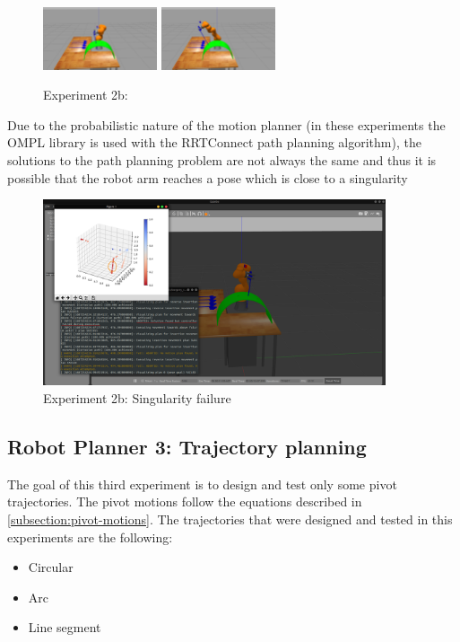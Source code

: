 \begin{center}
\begin{figure}[H]
\includegraphics[width=0.3\textwidth]{images/robot_planner2b/robot_planner2b_8}
\includegraphics[width=0.3\textwidth]{images/robot_planner2b/robot_planner2b_9}\\
\caption{Experiment 2b:}
\end{figure}
\end{center}

Due to the probabilistic nature of the motion planner (in these experiments the OMPL library is used with the RRTConnect path planning algorithm), the solutions 
to the path planning problem are not always the same and thus it is possible that the robot arm reaches a pose which is close to a singularity
\begin{center}
\begin{figure}[H]
\centering
\includegraphics[width=0.9\textwidth]{images/robot_planner2b/singularity_failure.png}
\caption{Experiment 2b: Singularity failure}
\end{figure}
\end{center}

\subsection{Robot Planner 3: Trajectory planning}

The goal of this third experiment is to design and test only some pivot trajectories. The pivot motions follow the equations described in 
\ref{subsection:pivot-motions}. The trajectories that were designed and tested in this experiments are the following:
\begin{itemize}
\item Circular
\item Arc
\item Line segment
\end{itemize}

